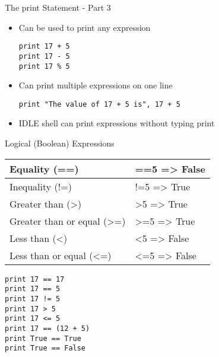 \begin{frame}[fragile]{The {\ttfamily print} Statement - Part 3}
  \begin{itemize}
    \item Can be used to print any expression
\begin{lstlisting}
print 17 + 5
print 17 - 5
print 17 % 5
\end{lstlisting}
\item Can print multiple expressions on one line
\begin{lstlisting}
print "The value of 17 + 5 is", 17 + 5
\end{lstlisting}
\item IDLE shell can print expressions without typing {\ttfamily print}
  \end{itemize}
\end{frame}

\begin{frame}[fragile]{Logical (Boolean) Expressions}
  \begin{center}
  \begin{tabular}{|ll|}\hline
    Equality ({\ttfamily ==}) & {\ttfamily 17==5} => {\ttfamily False} \\\hline
    Inequality ({\ttfamily !=}) & {\ttfamily 17!=5} => {\ttfamily True}\\\hline
    Greater than ({\ttfamily >}) & {\ttfamily 17>5} => {\ttfamily True}\\\hline
    Greater than or equal ({\ttfamily >=}) & {\ttfamily 17>=5} => {\ttfamily True}\\\hline
    Less than ({\ttfamily <}) & {\ttfamily 17<5} => {\ttfamily False}\\\hline
    Less than or equal ({\ttfamily <=}) & {\ttfamily 17<=5} => {\ttfamily False}\\\hline
  \end{tabular}
\end{center}

\begin{lstlisting}
print 17 == 17
print 17 == 5
print 17 != 5
print 17 > 5
print 17 <= 5
print 17 == (12 + 5)
print True == True
print True == False
\end{lstlisting}
\end{frame}

